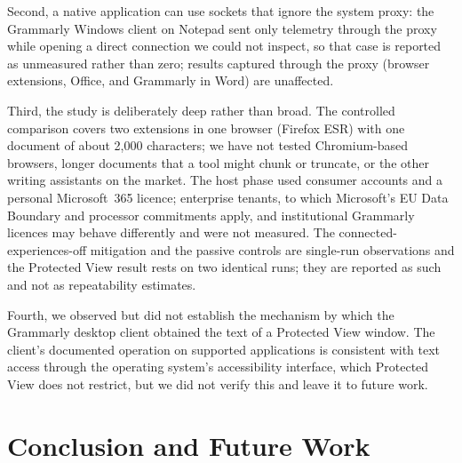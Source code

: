 \documentclass[sigconf,anonymous,review,balance=false]{acmart}
\begin{document}
Second, a native application can
use sockets that ignore the system proxy: the Grammarly Windows client on Notepad sent only
telemetry through the proxy while opening a direct connection we could not inspect, so that
case is reported as unmeasured rather than zero; results captured through the proxy (browser
extensions, Office, and Grammarly in Word) are unaffected.

Third, the study is deliberately deep rather than broad. The controlled comparison covers
two extensions in one browser (Firefox ESR) with one document of about 2{,}000 characters;
we have not tested Chromium-based browsers, longer documents that a tool might chunk or
truncate, or the other writing assistants on the market. The host phase used consumer
accounts and a personal Microsoft~365 licence; enterprise tenants, to which Microsoft's EU
Data Boundary and processor commitments apply, and institutional Grammarly licences may
behave differently and were not measured. The connected-experiences-off mitigation and the
passive controls are single-run observations and the Protected View result rests on two
identical runs; they are reported as such and not as repeatability estimates.

Fourth, we observed but did not establish the mechanism by which the Grammarly desktop
client obtained the text of a Protected View window. The client's documented operation on
supported applications is consistent with text access through the operating system's
accessibility interface, which Protected View does not restrict, but we did not verify this
and leave it to future work.

\section{Conclusion and Future Work}
\label{sec:conclusion}
\end{document}

